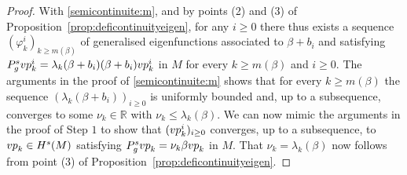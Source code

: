 \documentclass[10pt,a4paper]{amsart}
\newcommand{\R}{\mathbb{R}}
\newcommand{\vp}{{\rm vp}}
\begin{document}
\begin{proof}
With \eqref{semicontinuite:m}, and by points (2) and (3) of Proposition~\ref{prop:deficontinuityeigen}, for any $i \ge 0$ there thus exists a sequence $(\varphi_k^i)_{k \ge m(\beta)}$ of generalised eigenfunctions associated to $\beta + b_i$ and satisfying $P_g^s \vp_k^i = \lambda_k(\beta + b_i) (\beta + b_i) \vp_k^i$ in $M$ for every $k \ge m(\beta)$ and $i \ge 0$. The arguments in the proof of \eqref{semicontinuite:m} shows that for every $k \ge m(\beta)$ the sequence $(\lambda_k(\beta + b_i))_{i \ge 0}$ is uniformly bounded and, up to a subsequence, converges to some $\nu_k \in \R$ with $\nu_k \le \lambda_k(\beta)$. We can now mimic the arguments in the proof of Step $1$ to show that $( \vp_k^i)_{i \ge0}$ converges, up to a subsequence, to $\vp_k \in H^s(M)$ satisfying $P_g^s \vp_k = \nu_k \beta \vp_k$ in $M$. That $\nu_k = \lambda_k(\beta)$ now follows from point (3) of Proposition~\ref{prop:deficontinuityeigen}.
\end{proof}
\end{document}
